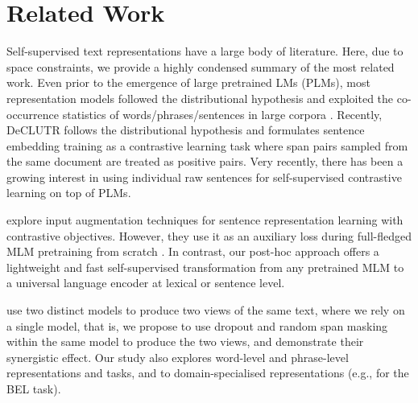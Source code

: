 \documentclass[11pt]{article}
\begin{document}
\section{Related Work}
Self-supervised text representations have a large body of literature. Here, due to space constraints, we provide a highly condensed summary of the most related work. Even prior to the emergence of large pretrained LMs (PLMs), most representation models followed the distributional hypothesis \citep{harris1954distributional} and exploited the co-occurrence statistics of words/phrases/sentences in large corpora  \citep{mikolov2013efficient,mikolov2013distributed,pennington-etal-2014-glove,kiros2015skip,hill2016learning,logeswaran2018an}. Recently, DeCLUTR \citep{giorgi-etal-2021-declutr} follows the  distributional hypothesis and formulates sentence embedding training as a contrastive learning task where span pairs sampled from the same document are treated as positive pairs. Very recently, there has been a growing interest in using individual raw sentences for self-supervised contrastive learning on top of PLMs. 

\citet{wu2020clear} explore input augmentation techniques for sentence representation learning with contrastive objectives. However, they use it as an auxiliary loss during full-fledged MLM pretraining from scratch \citep{rethmeier2021primer}. In contrast, our post-hoc approach offers a lightweight and fast self-supervised transformation from any pretrained MLM to a universal language encoder at lexical or sentence level.


\citet{carlsson2021semantic} use two distinct models to produce two views of the same text, where we rely on a single model, that is, we propose to use dropout and random span masking within the same model to produce the two views, and demonstrate their synergistic effect. Our study also explores word-level and phrase-level representations and tasks, and to domain-specialised representations (e.g., for the BEL task).
\end{document}
